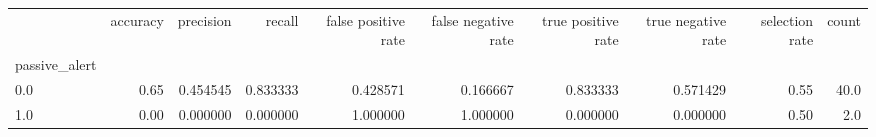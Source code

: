 \begin{tabular}{lrrrrrrrrr}
\toprule
{} &  accuracy &  precision &    recall &  false positive rate &  false negative rate &  true positive rate &  true negative rate &  selection rate &  count \\
passive\_alert &           &            &           &                      &                      &                     &                     &                 &        \\
\midrule
0.0           &      0.65 &   0.454545 &  0.833333 &             0.428571 &             0.166667 &            0.833333 &            0.571429 &            0.55 &   40.0 \\
1.0           &      0.00 &   0.000000 &  0.000000 &             1.000000 &             1.000000 &            0.000000 &            0.000000 &            0.50 &    2.0 \\
\bottomrule
\end{tabular}

